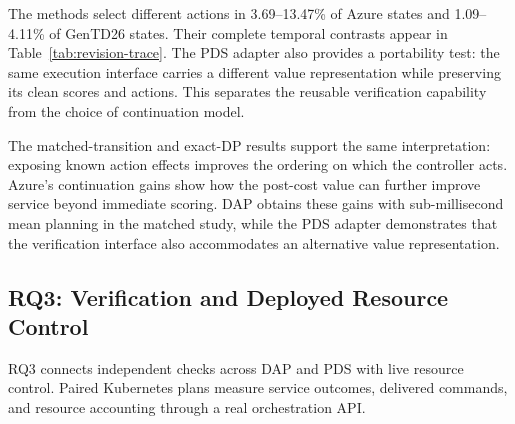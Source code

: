 \documentclass[acmsmall,screen,review,anonymous]{acmart}
\begin{document}
The methods select different actions in 3.69--13.47\% of Azure states and
1.09--4.11\% of GenTD26 states. Their complete temporal contrasts appear in
Table~\ref{tab:revision-trace}. The PDS adapter also provides a portability
test: the same execution interface carries a different value representation
while preserving its clean scores and actions. This separates the reusable
verification capability from the choice of continuation model.

The matched-transition and exact-DP results support the same interpretation:
exposing known action effects improves the ordering on which the controller
acts. Azure's continuation gains show how the post-cost value can further
improve service beyond immediate scoring. DAP obtains these gains with
sub-millisecond mean planning in the matched study, while the PDS adapter
demonstrates that the verification interface also accommodates an alternative
value representation.

\subsection{RQ3: Verification and Deployed Resource Control}
\label{sec:deployment}

RQ3 connects independent checks across DAP and PDS with live resource control.
Paired Kubernetes plans measure service outcomes, delivered commands, and
resource accounting through a real orchestration API.
\end{document}
